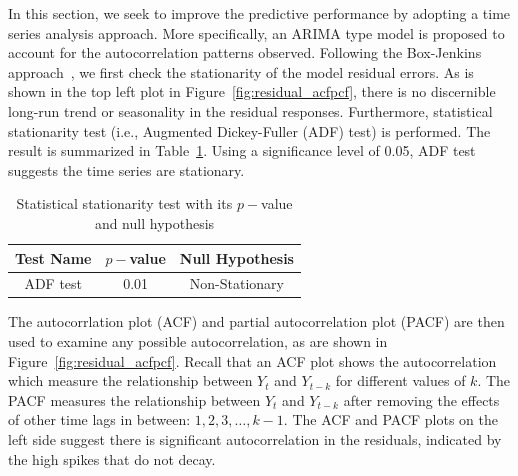 \documentclass [11pt, proquest] {uwthesis}[2015/03/03]
\begin{document}
In this section, we seek to improve the predictive performance by adopting a time series analysis approach. More specifically, an ARIMA type model is proposed to account for the autocorrelation patterns observed. Following the Box-Jenkins approach~\cite{Jenkins70}, we first check the stationarity of the model residual errors. As is shown in the top left plot in Figure~\ref{fig:residual_acfpcf}, there is no discernible long-run trend or seasonality in the residual responses. Furthermore, statistical stationarity test (i.e., Augmented Dickey-Fuller (ADF) test) is performed. The result is summarized in Table~\ref{tbl:stationarytest}. Using a significance level of 0.05, ADF test suggests the time series are stationary.

\begin{table}
 \centering 
\small
\begin{tabular}{ c | c | c} 
\hline 
  Test Name & $p-$value & Null Hypothesis \\ 
\hline
  ADF test  & 0.01  &  Non-Stationary \\ 
\hline 
\end{tabular} 
\caption{Statistical stationarity test with its $p-$value and null hypothesis} 
 \label{tbl:stationarytest} 
\vspace{-.2in}
\end{table} 

The autocorrlation plot (ACF) and partial autocorrelation plot (PACF) are then used to examine any possible autocorrelation, as are shown in Figure~\ref{fig:residual_acfpcf}. Recall that an ACF plot shows the autocorrelation which measure the relationship between $Y_t$ and $Y_{t-k}$ for different values of $k$.  The PACF measures the relationship between $Y_t$ and $Y_{t-k}$ after removing the effects of other time lags in between: $1, 2, 3, \hdots, k-1$. The ACF and PACF plots on the left side suggest there is significant autocorrelation in the residuals, indicated by the high spikes that do not decay.
\end{document}
